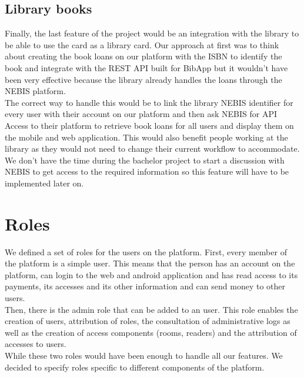 \documentclass[11pt,a4paper]{report}
\begin{document}
\subsection{Library books}
\label{books_feature}
Finally, the last feature of the project would be an integration with the library to be able to use the card as a library card. Our approach at first was to think about creating the book loans on our platform with the ISBN to identify the book and integrate with the REST API built for BibApp but it wouldn't have been very effective because the library already handles the loans through the NEBIS platform.\\

The correct way to handle this would be to link the library NEBIS identifier for every user with their account on our platform and then ask NEBIS for API Access to their platform to retrieve book loans for all users and display them on the mobile and web application. This would also benefit people working at the library as they would not need to change their current workflow to accommodate.\\

We don't have the time during the bachelor project to start a discussion with NEBIS to get access to the required information so this feature will have to be implemented later on.
\section{Roles}
\label{roles_section}
We defined a set of roles for the users on the platform. First, every member of the platform is a simple user. This means that the person has an account on the platform, can login to the web and android application and has read access to its payments, its accesses and its other information and can send money to other users.\\

Then, there is the admin role that can be added to an user. This role enables the creation of users, attribution of roles, the consultation of administrative logs as well as the creation of access components (rooms, readers) and the attribution of accesses to users.\\

While these two roles would have been enough to handle all our features. We decided to specify roles specific to different components of the platform.\\
\end{document}
